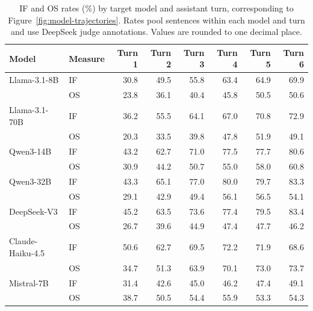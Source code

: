 \begin{table}[htbp]
\centering
\small
\caption{IF and OS rates (\%) by target model and assistant turn,
corresponding to Figure~\ref{fig:model-trajectories}.
Rates pool sentences within each model and turn and use
DeepSeek judge annotations. Values are rounded to one decimal place.}
\label{tab:model-turn-rates}
\begin{tabular}{llrrrrrr}
\toprule
Model & Measure & Turn 1 & Turn 2 & Turn 3 & Turn 4 & Turn 5 & Turn 6 \\
\midrule
Llama-3.1-8B & IF & 30.8 & 49.5 & 55.8 & 63.4 & 64.9 & 69.9 \\
 & OS & 23.8 & 36.1 & 40.4 & 45.8 & 50.5 & 50.6 \\
\addlinespace
Llama-3.1-70B & IF & 36.2 & 55.5 & 64.1 & 67.0 & 70.8 & 72.9 \\
 & OS & 20.3 & 33.5 & 39.8 & 47.8 & 51.9 & 49.1 \\
\addlinespace
Qwen3-14B & IF & 43.2 & 62.7 & 71.0 & 77.5 & 77.7 & 80.6 \\
 & OS & 30.9 & 44.2 & 50.7 & 55.0 & 58.0 & 60.8 \\
\addlinespace
Qwen3-32B & IF & 43.3 & 65.1 & 77.0 & 80.0 & 79.7 & 83.3 \\
 & OS & 29.1 & 42.9 & 49.4 & 56.1 & 56.5 & 54.1 \\
\addlinespace
DeepSeek-V3 & IF & 45.2 & 63.5 & 73.6 & 77.4 & 79.5 & 83.4 \\
 & OS & 26.7 & 39.6 & 44.9 & 47.4 & 47.7 & 46.2 \\
\addlinespace
Claude-Haiku-4.5 & IF & 50.6 & 62.7 & 69.5 & 72.2 & 71.9 & 68.6 \\
 & OS & 34.7 & 51.3 & 63.9 & 70.1 & 73.0 & 73.7 \\
\addlinespace
Mistral-7B & IF & 31.4 & 42.6 & 45.0 & 46.2 & 47.4 & 49.1 \\
 & OS & 38.7 & 50.5 & 54.4 & 55.9 & 53.3 & 54.3 \\
\bottomrule
\end{tabular}
\end{table}
